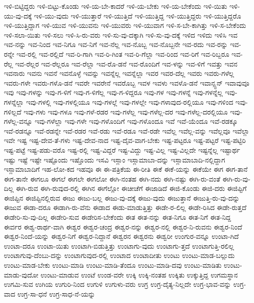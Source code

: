 {ಇಳಿ-ಬಿಟ್ಟಿದ್ದರು
ಇಳಿ-ಬಿಟ್ಟು-ಕೊಂಡು
ಇಳಿ-ಯ-ಬೇ-ಕಾದರೆ
ಇಳಿ-ಯ-ಬೇಕು
ಇಳಿ-ಯ-ಬೇಕೆಂದು
ಇಳಿ-ಯಿತು
ಇಳಿ-ಯು-ವು-ದಕ್ಕೆ
ಇಳಿ-ಯು-ವುದು
ಇಳಿ-ಯುತ್ತಾರೆ
ಇಳಿ-ಯುತ್ತಿದೆ
ಇಳಿ-ಯುತ್ತಿದ್ದ
ಇಳಿ-ಯುತ್ತಿದ್ದರು
ಇಳಿ-ಯುತ್ತಿದ್ದರೊ
ಇಳಿ-ಯುತ್ತಿದ್ದಾಗ
ಇಳಿ-ಯುವ
ಇಳಿ-ಯುವನು
ಇಳಿ-ಯುವರು
ಇಳಿ-ಯುವಾಗ
ಇಳಿ-ಸ-ಬೇ-ಕಾಗಿತ್ತು
ಇಳಿ-ಸ-ಬೇಕೆಂದು
ಇಳಿ-ಸಲಾ-ಯಿತು
ಇಳಿ-ಸಲು
ಇಳಿ-ಸಿ-ರು-ವರು
ಇಳಿ-ಸು-ವು-ದಕ್ಕಾಗಿ
ಇಳಿ-ಸು-ವು-ದಕ್ಕೆ
ಇಳಿದ
ಇಳಿದು
ಇಳಿಸಿ
ಇವ
ಇವ-ನನ್ನು
ಇವ-ನಿಂದ
ಇವ-ನಿಗೂ
ಇವ-ನಿಗೆ
ಇವ-ನೆಲ್ಲ
ಇವ-ನೊಬ್ಬ
ಇವ-ನೊಬ್ಬನೇ
ಇವ-ರದು
ಇವ-ರನ್ನು
ಇವ-ರನ್ನೇ
ಇವ-ರಲ್ಲಿ
ಇವ-ರಲ್ಲಿದೆ
ಇವ-ರಿ-ಗಾಗಿ
ಇವ-ರಿ-ಗಿಂತ
ಇವ-ರಿ-ಗೆಲ್ಲಾ
ಇವ-ರಿಂದ
ಇವ-ರಿಗೆ
ಇವ-ರಿಬ್ಬರೂ
ಇವ-ರೆಲ್ಲ
ಇವ-ರೆಲ್ಲರ
ಇವ-ರೆಲ್ಲರೂ
ಇವ-ರೆಲ್ಲಾ
ಇವ-ರೊ-ಡನೆ
ಇವ-ರೊಂದಿಗೆ
ಇವ-ಳನ್ನು
ಇವ-ಳಿಗೆ
ಇವತ್ತು
ಇವನ
ಇವನಾರು
ಇವನು
ಇವನೆ
ಇವನೊಳ್ಳೆ
ಇವನ್ನು
ಇವನ್ನೆಲ್ಲ
ಇವನ್ನೆಲ್ಲಾ
ಇವರ
ಇವರ-ದೆಲ್ಲ
ಇವರು
ಇವರು-ಗಳೆಲ್ಲ
ಇವರು-ಗಳೇ
ಇವರು-ಗಳೊ-ಡನೆ
ಇವರೇ
ಇವರೇನೆ
ಇವರೊಬ್ಬ
ಇವಳ
ಇವಳು
ಇವಳೊ-ಡನೆ
ಇವಾನ್ಸ್ಟನ್
ಇವಾವುವೂ
ಇವು
ಇವು-ಗಳನ್ನು
ಇವು-ಗ-ಳಿಗೆ
ಇವು-ಗ-ಳಿಗೆಲ್ಲ
ಇವು-ಗ-ಳಿದ್ದರೂ
ಇವು-ಗಳ
ಇವು-ಗಳನ್ನೆ
ಇವು-ಗಳನ್ನೆಲ್ಲ
ಇವು-ಗಳನ್ನೆಲ್ಲಾ
ಇವು-ಗಳಲ್ಲಿ
ಇವು-ಗಳಲ್ಲಿಯೂ
ಇವು-ಗಳಲ್ಲೆ
ಇವು-ಗಳಲ್ಲೇ
ಇವು-ಗಳಾವುದ-ರಲ್ಲಿಯೂ
ಇವು-ಗಳಿಂದ
ಇವು-ಗಳಿಲ್ಲದೆ
ಇವು-ಗಳು
ಇವು-ಗಳೂ
ಇವು-ಗಳೆ-ರಡರ
ಇವು-ಗಳೆಲ್ಲ
ಇವು-ಗಳೆಲ್ಲ-ದರ
ಇವು-ಗಳೆಲ್ಲ-ದರಲ್ಲಿಯೂ
ಇವು-ಗಳೆಲ್ಲ-ವನ್ನೂ
ಇವು-ಗಳೆಲ್ಲಾ
ಇವು-ಗಳೇ
ಇವು-ಗಳೊಂದಿಗೆ
ಇವು-ಗಳೊಂದೂ
ಇವೆ
ಇವೆ-ಯೆಂದೂ
ಇವೆ-ರಡಕ್ಕೂ
ಇವೆ-ರಡನ್ನೂ
ಇವೆ-ರಡನ್ನೇ
ಇವೆ-ರಡರ
ಇವೆ-ರಡು
ಇವೆ-ರಡೂ
ಇವೆ-ರಡೇ
ಇವೆಲ್ಲ
ಇವೆಲ್ಲ-ವನ್ನು
ಇವೆಲ್ಲವೂ
ಇವೆಲ್ಲಾ
ಇವೇ
ಇಷ್ಟ
ಇಷ್ಟ-ದೇವ-ತೆ-ಗಳು
ಇಷ್ಟ-ದೇವ-ನಾದ
ಇಷ್ಟ-ದೈವ-ವಾಗ-ಬೇಕು
ಇಷ್ಟ-ಪಟ್ಟರೂ
ಇಷ್ಟ-ಪಟ್ಟರೆ
ಇಷ್ಟ-ಪಟ್ಟಿರಿ
ಇಷ್ಟ-ಪಟ್ಟೆ
ಇಷ್ಟ-ಪಡು-ವರೊ
ಇಷ್ಟ-ರಲ್ಲಿ
ಇಷ್ಟ-ವಿದ್ದರೆ
ಇಷ್ಟ-ವಿದ್ದು
ಇಷ್ಟ-ವಿಲ್ಲ
ಇಷ್ಟ-ವಿಲ್ಲದೇ
ಇಷ್ಟನ್ನೆಲ್ಲ
ಇಷ್ಟಾರ್ಥ
ಇಷ್ಟು
ಇಷ್ಟೆ
ಇಷ್ಟೇ
ಇಷ್ಟೊಂದು
ಇಷ್ತೊಂದು
ಇಸವಿ
ಇಸ್ಲಾಂ
ಇಸ್ಲಾಮಾಬಾ-ದನ್ನು
ಇಸ್ಲಾಮಾಬಾದಿ-ನಲ್ಲಿದ್ದಾಗ
ಇಸ್ಲಾಮಾಬಾದಿಗೆ
ಇಹ-ಲೋ-ಕದ
ಇಹವೂ
ಈ
ಈ-ಪತ್ರಿಕೆಯ
ಈ-ರೀತಿ
ಈಕೆ
ಈಕೆ-ಯನ್ನು
ಈಕೆಯೇ
ಈಗ
ಈಗ-ತಾನೆ
ಈಗ-ತಾನೇ
ಈಗಲೂ
ಈಗಲೆ
ಈಗಲೇ
ಈಗಲೋ
ಈಗಿ-ನಂತಹ
ಈಗಿ-ನದು
ಈಗಿ-ನಷ್ಟು
ಈಗಿ-ರು-ವಂತೆ
ಈಗಿ-ರು-ವು-ದಿಲ್ಲ
ಈಗಿ-ರುವ
ಈಗಿ-ರುವುದ-ರಲ್ಲಿ
ಈಗಿನ
ಈಗೆಲ್ಲೋ
ಈಚೀಚೆಗೆ
ಈಜಾಡಿದೆ
ಈಜಿ-ಕೊಂಡು
ಈಜಿ-ದರು
ಈಜಿಪ್ಟಿಗೆ
ಈಜಿಪ್ಟಿನ
ಈಜಿಪ್ಟಿನಲ್ಲಿರುವ
ಈಜು
ಈಜು-ಬಲ್ಲ
ಈಜು-ವು-ದಕ್ಕೆ
ಈಜು-ವುದು
ಈಜುತ್ತಾನೆ
ಈಜುತ್ತಿ-ರು-ವು-ದನ್ನು
ಈಜುವ
ಈಡಾ-ದರೂ
ಈಡಾಗಿ-ರು-ವೆನು
ಈಡಾದ
ಈಡು-ಮಾಡುತ್ತಿತ್ತು
ಈಡೇ-ರ-ಲಿಲ್ಲ
ಈಡೇ-ರಿಸಿದ
ಈಡೇ-ರುತ್ತದೆ
ಈಡೇರಿ-ಸು-ವು-ದಿಲ್ಲ
ಈಡೇರಿ-ಸುವ
ಈಡೇರಿಸ-ಬೇಕೆಂದು
ಈತ
ಈತ-ನನ್ನು
ಈತ-ನಿಗೂ
ಈತ-ನಿಗೆ
ಈತ-ನಿದ್ದ
ಈರ್ವರ
ಈಶ್ವ-ರಾರ್ಥ-ವಾಗಿ
ಈಶ್ವರ
ಈಶ್ವರ-ಚಂದ್ರ
ಈಶ್ವರ-ನನ್ನು
ಈಶ್ವರ-ನಲ್ಲಿ
ಈಶ್ವರ-ನಿ-ರುವನು
ಈಶ್ವರ-ನಿಂದೆ
ಈಶ್ವರ-ನಿಂದೆ-ಯನ್ನು
ಈಶ್ವರ-ನಿಗೆ
ಈಶ್ವರ-ನಿದ್ದಾನೆ
ಈಶ್ವರನ
ಈಶ್ವರನು
ಈಶ್ವರೀ
ಉಂಗುರ-ವನ್ನೂ
ಉಂಟಾ-ಗಿದೆ
ಉಂಟಾ-ದರೂ
ಉಂಟಾ-ಯಿತು
ಉಂಟಾಗಿ-ಬಿಡುತ್ತಿತ್ತು
ಉಂಟಾಗು-ವುದು
ಉಂಟಾಗು-ತ್ತದೆ
ಉಂಟಾಗುತ್ತಿ-ರಲಿಲ್ಲ
ಉಂಟಾಗುವು-ದೆಂಬು-ದನ್ನು
ಉಂಟಾಗುವುದ-ರಲ್ಲಿ
ಉಂಟಾದ
ಉಂಟಾದೀತು
ಉಂಟು
ಉಂಟು-ಮಾಡ-ಬಲ್ಲುದು
ಉಂಟು-ಮಾಡ-ಬೇಕು
ಉಂಟು-ಮಾಡಿ
ಉಂಟು-ಮಾಡಿ-ತೆಂದೂ
ಉಂಟು-ಮಾಡಿ-ದವು
ಉಂಟು-ಮಾಡಿತು
ಉಂಟು-ಮಾಡು-ವುದೋ
ಉಂಟು-ಮಾಡುವ
ಉಂಟೆ
ಉಂಡ-ವರೇ
ಉಕ್ಕಿ
ಉಕ್ಕಿ-ನಂತಹ
ಉಕ್ಕಿತು
ಉಕ್ಕುತ್ತಿದ್ದ
ಉಗಮಸ್ಥಾನ
ಉಗಮಿ-ಸುವ
ಉಗಿಯ
ಉಗುರಿ-ನಿಂದ
ಉಗುಳಿ
ಉಗುಳು-ವರು
ಉಗ್ರ
ಉಗ್ರ-ದೈತ್ಯ-ನಿಲ್ಲದೇ
ಉಗ್ರ-ಭಾವ-ವನ್ನು
ಉಗ್ರ-ವಾದ
ಉಗ್ರ-ಸಾ-ಧನೆ
ಉಗ್ರ-ಸಾಧ-ನೆ-ಯನ್ನು
}
